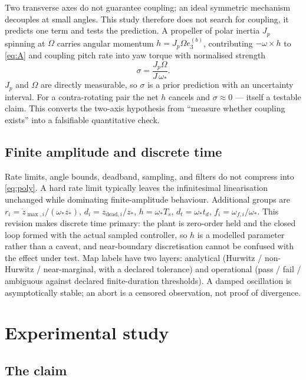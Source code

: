 \documentclass[11pt,a4paper]{article}
\begin{document}
Two transverse axes do not guarantee coupling; an ideal symmetric mechanism decouples at small
angles. This study therefore does not search for coupling, it predicts one term and tests the
prediction. A propeller of polar inertia $J_p$ spinning at $\Omega$ carries angular momentum
$h=J_p\Omega e_3^{(b)}$, contributing $-\omega\times h$ to \eqref{eq:A} and coupling pitch rate into
yaw torque with normalised strength
\begin{equation}
\sigma = \frac{J_p\Omega}{J\,\omega_*}.
\end{equation}
$J_p$ and $\Omega$ are directly measurable, so $\sigma$ is a prior prediction with an uncertainty
interval. For a contra-rotating pair the net $h$ cancels and $\sigma\approx 0$ --- itself a testable
claim. This converts the two-axis hypothesis from ``measure whether coupling exists'' into a
falsifiable quantitative check.

\subsection{Finite amplitude and discrete time}

Rate limits, angle bounds, deadband, sampling, and filters do not compress into \eqref{eq:poly}. A
hard rate limit typically leaves the infinitesimal linearisation unchanged while dominating
finite-amplitude behaviour. Additional groups are $r_i=\dot z_{\max,i}/(\omega_*z_*)$,
$d_i=z_{\text{dead},i}/z_*$, $h=\omega_*T_s$, $d_t=\omega_*t_d$, $f_i=\omega_{f,i}/\omega_*$.
This revision makes discrete time primary: the plant is zero-order held and the closed loop
formed with the actual sampled controller, so $h$ is a modelled parameter rather than a caveat, and
near-boundary discretisation cannot be confused with the effect under test. Map labels have two
layers: analytical (Hurwitz / non-Hurwitz / near-marginal, with a declared tolerance) and operational
(pass / fail / ambiguous against declared finite-duration thresholds). A damped oscillation is
asymptotically stable; an abort is a censored observation, not proof of divergence.

\section{Experimental study}\label{sec:experiment}

\subsection{The claim}
\end{document}
